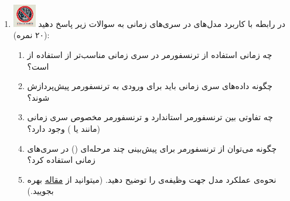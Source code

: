 \documentclass[12pt]{article}
\begin{document}
\begin{enumerate}
    \item \includegraphics[width=1cm]{figs/Forbidden_AI.jpg}
    در رابطه با کاربرد مدل‌های  در سری‌های زمانی به سوالات زیر پاسخ دهید (۲۰ نمره):
    \begin{enumerate}
        \item چه زمانی استفاده از ترنسفورمر در سری زمانی مناسب‌تر از استفاده از  است؟
        \item چگونه داده‌های سری زمانی باید برای ورودی به ترنسفورمر پیش‌پردازش شوند؟
        \item چه تفاوتی بین ترنسفورمر استاندارد و ترنسفورمر مخصوص سری زمانی (مانند   یا ) وجود دارد؟
        \item چگونه می‌توان از ترنسفورمر برای پیش‌بینی چند مرحله‌ای () در سری‌های زمانی استفاده کرد؟
        \item نحوه‌ی عملکرد مدل  جهت وظیفه‌ی  را توضیح دهید. (میتوانید از \href{https://arxiv.org/pdf/2310.06625}{مقاله} بهره بجویید.)
    \end{enumerate}
    
    	

\end{enumerate}
\end{document}
